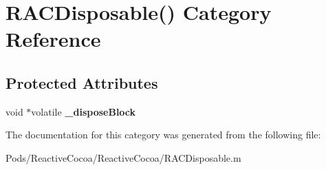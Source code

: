\hypertarget{category_r_a_c_disposable_07_08}{}\section{R\+A\+C\+Disposable() Category Reference}
\label{category_r_a_c_disposable_07_08}
\subsection*{Protected Attributes}
\begin{DoxyCompactItemize}
\item 
\mbox{\label{category_r_a_c_disposable_07_08_a7fe323cbd0075311f908f765bfe67ba6}} 
void $\ast$volatile {\bfseries \+\_\+dispose\+Block}
\end{DoxyCompactItemize}


The documentation for this category was generated from the following file\+:\begin{DoxyCompactItemize}
\item 
Pods/\+Reactive\+Cocoa/\+Reactive\+Cocoa/R\+A\+C\+Disposable.\+m\end{DoxyCompactItemize}
